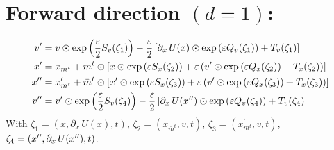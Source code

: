 \documentclass[../main.tex]{subfiles}
\begin{document}
%
%
\section{Forward direction \texorpdfstring{$(d = 1)$}{(d = 1)}:}%
\label{sec:lf_forward}
\begin{align}
  \vp &= v \odot \exp{\left(\frac{\eps}{2}S_{v}(\zeta_{1})\right)}%
        - \frac{\eps}{2}\left[\partial_{x}\,U(x)\odot \exp{\left(\eps
          Q_{v}(\zeta_{1})\right)}%
        + T_{v}(\zeta_{1})\right] \\
  \xp &= x_{\bar{m}^{t}} + m^{t}\odot \left[x \odot \exp{\left(\eps
    S_{x}(\zeta_{2})\right)}%
        + \eps\left(\vp\odot\exp{\left(\eps Q_{x}(\zeta_{2})\right)} 
          + T_{x}(\zeta_{2})\right)\right] \\
  \xpp &= x^{\prime}_{m^{t}} + \bar{m}^{t}\odot \left[\xp \odot \exp{\left(\eps
    S_{x}(\zeta_{3})\right)}%
        + \eps\left(\vp\odot\exp{\left(\eps Q_{x}(\zeta_{3})\right)} +
      T_{x}(\zeta_{3})\right)\right] \\
  \vpp &= \vp \odot \exp{\left(\frac{\eps}{2}S_{v}(\zeta_{4})\right)}%
        - \frac{\eps}{2}\left[\partial_{x}\,U(\xpp)\odot \exp{\left(\eps
          Q_{v}(\zeta_{4})\right)}%
          + T_{v}(\zeta_{4})\right]
\end{align} 
%
With $\zeta_{1} = (x, \partial_{x}\, U(x), t)$, $\zeta_{2} = (x_{\bar{m}^{t}},
v, t)$, $\zeta_{3} = (x^{\prime}_{m^{t}}, v, t)$, $\zeta_{4} = ({x^{\prime\prime}},
\partial_{x}\, U({x^{\prime\prime}}), t)$.
%
\end{document}
